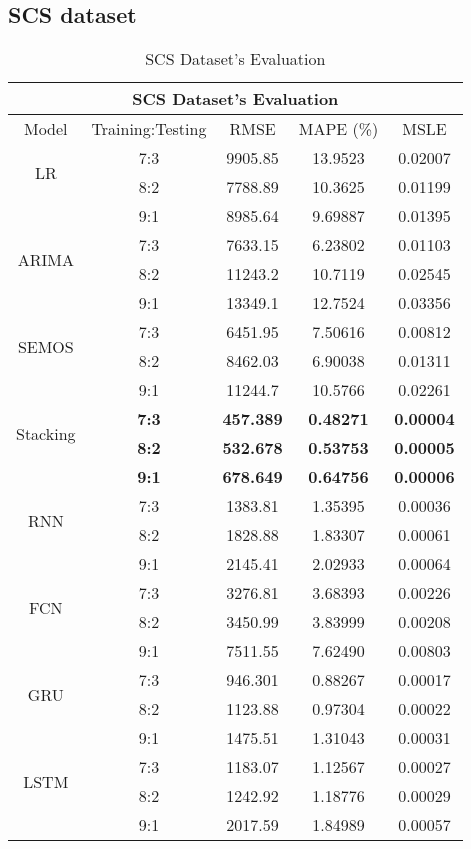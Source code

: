 \documentclass{ieeeojies}
\begin{document}
\subsection{SCS dataset} 
\begin{table}[H]
    \centering
    \begin{tabular}{|c|c|c|c|c|}
         \hline
         \multicolumn{5}{|c|}{\textbf{SCS Dataset's Evaluation}}\\
         \hline
         \centering Model & Training:Testing & RMSE & MAPE (\%) & MSLE\\
         \hline
        \multirow{2}{*}{LR} & 7:3 & 9905.85 & 13.9523 & 0.02007 \\ & 8:2 & 7788.89 & 10.3625 & 0.01199 \\ & 9:1 & 8985.64 & 9.69887 & 0.01395 \\
        \hline
        \multirow{2}{*}{ARIMA} & 7:3 & 7633.15 & 6.23802 & 0.01103 \\ & 8:2 & 11243.2 & 10.7119 & 0.02545 \\ & 9:1 & 13349.1 & 12.7524 & 0.03356 \\
        \hline
        \multirow{2}{*}{SEMOS} & 7:3 & 6451.95 & 7.50616 & 0.00812 \\ & 8:2 & 8462.03 & 6.90038 & 0.01311 \\ & 9:1 & 11244.7 & 10.5766 & 0.02261 \\
        \hline
        \multirow{2}{*}{Stacking} & \textbf{7:3} & \textbf{457.389} & \textbf{0.48271} & \textbf{0.00004} \\ & \textbf{8:2} & \textbf{532.678} & \textbf{0.53753} & \textbf{0.00005} \\ & \textbf{9:1} & \textbf{678.649} & \textbf{0.64756} & \textbf{0.00006} \\
        \hline
        \multirow{2}{*}{RNN} & 7:3 & 1383.81 & 1.35395 & 0.00036 \\ & 8:2 & 1828.88 & 1.83307 & 0.00061 \\ & 9:1 & 2145.41 & 2.02933 & 0.00064 \\
        \hline
        \multirow{2}{*}{FCN} & 7:3 & 3276.81 & 3.68393 & 0.00226 \\ & 8:2 & 3450.99 & 3.83999 & 0.00208 \\ & 9:1 & 7511.55 & 7.62490 & 0.00803 \\
        \hline
        \multirow{2}{*}{GRU} & 7:3 & 946.301 & 0.88267 & 0.00017 \\ & 8:2 & 1123.88 & 0.97304 & 0.00022 \\ & 9:1 & 1475.51 & 1.31043 & 0.00031 \\
        \hline 
        \multirow{2}{*}{LSTM} & 7:3 & 1183.07 & 1.12567 & 0.00027 \\ & 8:2 & 1242.92 & 1.18776 &  0.00029 \\ & 9:1 & 2017.59 & 1.84989 & 0.00057 \\
        \hline
        
    \end{tabular}
    \caption{SCS Dataset's Evaluation}
    \label{vcbresult}
\end{table}
\end{document}
